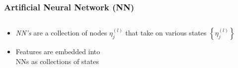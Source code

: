 \documentclass[xcolor={dvipsnames}]{beamer}
\begin{document}
\frame
{
 \frametitle{Artificial Neural Network (NN)}
\begin{columns}
\begin{column}{.6\textwidth}
\begin{itemize}
\item  \emph{NN's} are a collection of nodes $\eta^{(l)}_j$ that take on various states $\left\{\eta^{(l)}_j\right\}$
\item<1-> Features are embedded into \\NNs as collections of states  
\end{itemize}
\footnotesize
{}


\end{column}
\end{columns}}
\end{document}
